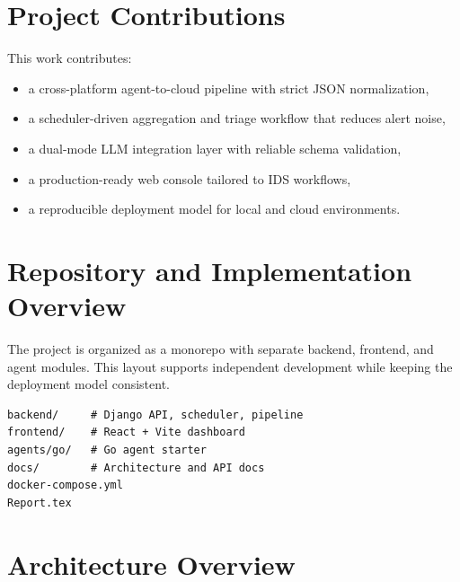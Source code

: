 \documentclass[conference]{IEEEtran}
\begin{document}
\section{Project Contributions}
This work contributes:
\begin{itemize}[leftmargin=1.2em]
    \item a cross-platform agent-to-cloud pipeline with strict JSON normalization,
    \item a scheduler-driven aggregation and triage workflow that reduces alert noise,
    \item a dual-mode LLM integration layer with reliable schema validation,
    \item a production-ready web console tailored to IDS workflows,
    \item a reproducible deployment model for local and cloud environments.
\end{itemize}

\section{Repository and Implementation Overview}
The project is organized as a monorepo with separate backend, frontend, and agent modules. This layout supports independent development while keeping the deployment model consistent.
\begin{lstlisting}[caption={Repository layout (abridged)}]
backend/     # Django API, scheduler, pipeline
frontend/    # React + Vite dashboard
agents/go/   # Go agent starter
docs/        # Architecture and API docs
docker-compose.yml
Report.tex
\end{lstlisting}

\section{Architecture Overview}
\end{document}
